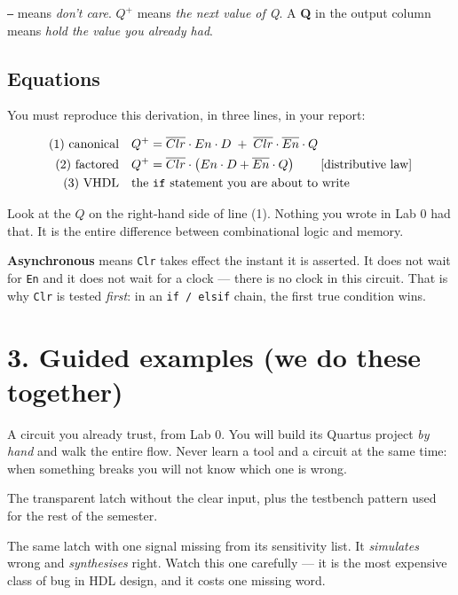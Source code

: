 \documentclass[11pt]{article}
\newcommand{\code}[1]{\texttt{#1}}
\begin{document}
\code{--} means \emph{don't care}. \; $Q^{+}$ means \emph{the next value of Q}. \;
A \textbf{Q} in the output column means \emph{hold the value you already had}.

\subsection*{Equations}

You must reproduce this derivation, in three lines, in your report:

\begin{align*}
\text{(1) canonical} \quad & Q^{+} = \overline{Clr}\cdot En\cdot D \;+\; \overline{Clr}\cdot\overline{En}\cdot Q\\
\text{(2) factored} \quad & Q^{+} = \overline{Clr}\cdot\left( En\cdot D + \overline{En}\cdot Q \right) \qquad \text{[distributive law]}\\
\text{(3) VHDL} \quad & \text{the \code{if} statement you are about to write}
\end{align*}

Look at the $Q$ on the right-hand side of line (1). Nothing you wrote in Lab 0 had
that. It is the entire difference between combinational logic and memory.

\textbf{Asynchronous} means \code{Clr} takes effect the instant it is asserted. It
does not wait for \code{En} and it does not wait for a clock --- there is no clock
in this circuit. That is why \code{Clr} is tested \emph{first}: in an
\code{if\,/\,elsif} chain, the first true condition wins.

\section*{3. Guided examples (we do these together)}

\begin{description}[leftmargin=2.4em,style=nextline,itemsep=2pt]
\item[Example 1 --- \code{majority3}] A circuit you already trust, from Lab 0. You
will build its Quartus project \emph{by hand} and walk the entire flow. Never learn
a tool and a circuit at the same time: when something breaks you will not know
which one is wrong.
\item[Example 2 --- \code{trans\_latch}] The transparent latch without the clear
input, plus the testbench pattern used for the rest of the semester.
\item[Example 3 --- \code{trans\_latch\_bad}] The same latch with one signal
missing from its sensitivity list. It \emph{simulates} wrong and \emph{synthesises}
right. Watch this one carefully --- it is the most expensive class of bug in HDL
design, and it costs one missing word.
\end{description}
\end{document}
